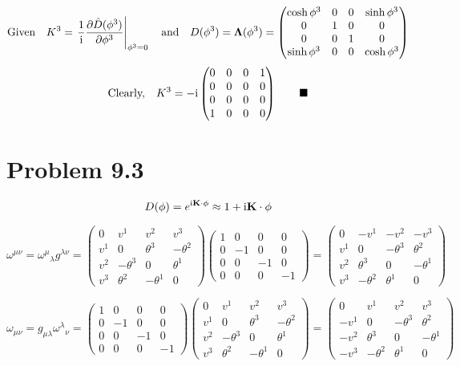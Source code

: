\documentclass{article}
\begin{document}
\[\qq*{Given}K^3=\eval{\frac{1}{\text{i}}\pdv{\hat{D}(\phi^3)}{\phi^3}}_{\phi^3=0}\qq{and}
D(\phi^3)=\vb{\Lambda}(\phi^3)=\begin{pmatrix}
\cosh{\phi^3}&0&0&\sinh{\phi^3}\\
0&1 & 0&0 \\ 
0 & 0&1&0\\
\sinh{\phi^3}&0&0&\cosh{\phi^3}
\end{pmatrix}
\]
\[\qq*{Clearly,}K^3=-\text{i}\begin{pmatrix}
		0&0&0&1\\
		0 & 0&0&0\\
		0&0&0&0 \\
		1&0 & 0&0 
		\end{pmatrix}\qquad\blacksquare
\] 
\section*{Problem 9.3}
\[D(\vb{\phi})=e^{\text{i}\vb{K}\cdot\vb{\phi}}\approx 1+\text{i}\vb{K}\cdot\vb{\phi}
\]




\[\omega^{\mu\nu}={\omega^\mu}_\lambda g^{\lambda\nu}=\begin{pmatrix}0&v^1&v^2&v^3\\v^1&0&\theta^3&-\theta^2\\v^2&-\theta^3&0&\theta^1\\v^3&\theta^2&-\theta^1&0\end{pmatrix}
\begin{pmatrix}1&0&0&0\\0&-1&0&0\\0&0&-1&0\\0&0&0&-1\end{pmatrix}=
\begin{pmatrix}0&-v^1&-v^2&-v^3\\v^1&0&-\theta^3&\theta^2\\v^2&\theta^3&0&-\theta^1\\v^3&-\theta^2&\theta^1&0\end{pmatrix}\]

\[\omega_{\mu\nu}=g_{\mu\lambda}{\omega^\lambda}_\nu =\begin{pmatrix}1&0&0&0\\0&-1&0&0\\0&0&-1&0\\0&0&0&-1\end{pmatrix}
\begin{pmatrix}0&v^1&v^2&v^3\\v^1&0&\theta^3&-\theta^2\\v^2&-\theta^3&0&\theta^1\\v^3&\theta^2&-\theta^1&0\end{pmatrix}=
\begin{pmatrix}0&v^1&v^2&v^3\\-v^1&0&-\theta^3&\theta^2\\-v^2&\theta^3&0&-\theta^1\\-v^3&-\theta^2&\theta^1&0\end{pmatrix}\]
\end{document}
